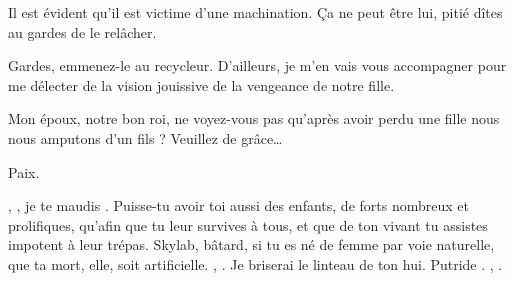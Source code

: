 \begin{drama}
  \reinespeaks Il est évident qu’il est victime d’une machination. Ça ne peut être lui, pitié dîtes au gardes de le relâcher.

  \roispeaks Gardes, emmenez-le au recycleur. D’ailleurs, je m’en vais vous accompagner pour me délecter de la vision jouissive de la vengeance de notre fille.

  \reinespeaks {} Mon époux, notre bon roi, ne voyez-vous pas qu’après avoir perdu une fille nous nous amputons d’un fils ? Veuillez de grâce…

  \roispeaks {} Paix.



  \reinespeaks {} \elena, \elena, je te maudis \elena. Puisse-tu avoir toi aussi des enfants, de forts nombreux et prolifiques, qu’afin que tu leur survives à tous, et que de ton vivant tu assistes impotent à leur trépas. \elena Skylab, bâtard, si tu es né de femme par voie naturelle, que ta mort, elle, soit artificielle. \elena, \elena. Je briserai le linteau de ton hui. Putride \elena. \elena, \elena {}.

\end{drama}

